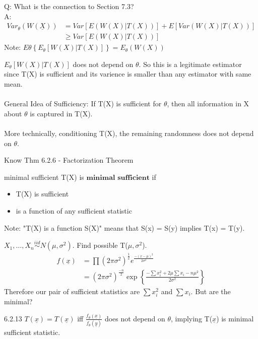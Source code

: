 \documentclass[11pt,fleqn]{book} %
\begin{document}
Q: What is the connection to Section 7.3?\\
A: \begin{align*}
Var_\theta(W(\underline{X})) &= Var\left[E(W(X)|T(X))\right] + E\left[Var(W(X)|T(X)) \right]\\
&\ge Var\left[E(W(X)|T(X))\right]	
\end{align*} 
Note: $E\theta \left\{E_\theta[W(X)|T(X)] \right\} = E_\theta(W(X))$

$E_\theta[W(X)|T(X)]$ does not depend on $\theta$. So this is a legitimate estimator since T(X) is sufficient and its varience is smaller than any estimator with same mean. \\
\\
General Idea of Sufficiency: If T(X) is sufficient for $\theta$, then all information in X about $\theta$ is captured in T(X). \\
\\
More technically, conditioning T(X), the remaining randomness does not depend on $\theta$.

\begin{remark}
	Know Thm 6.2.6 - Factorization Theorem
\end{remark}

\begin{definition}{minimal sufficient}
	 T(X) is $\textbf{minimal sufficient}$ if 
	 \begin{itemize}
	 	\item T(X) is sufficient
	 	\item is a function of any sufficient statistic
	 \end{itemize}
	 Note: "T(X) is a function S(X)" means that S(x) = S(y) implies T(x) = T(y).
\end{definition}

\begin{example}
	 $X_1, \dots, X_n \stackrel{iid}{\sim} N(\mu,\sigma^2)$. Find possible T($\mu,\sigma^2$).\\
	 \begin{align*}
	 f(\underline{x}) &= \prod (2\pi\sigma^2)^{\frac{1}{2}} e^{\frac{-(x-\mu)^2}{2\sigma^2}}\\
	 &= (2\pi\sigma^2)^{\frac{-n}{2}}\exp\left\{\frac{-\sum x_i^2 + 2\mu \sum x_i - n\mu^2}{2\sigma^2}\right\}
	 \end{align*}
Therefore our pair of sufficient statistics are $\sum x_i^2$ and $\sum x_i$. But are the minimal?
\end{example}

\begin{theorem}{6.2.13} $T(\underline{x}) = T(\underline{x})$ iff $\frac{f_\theta (\underline{x})}{f_\theta(\underline{y})}$ does not depend on $\theta$, implying T($\underline{x}$) is minimal sufficient statistic. 
\end{theorem}
\end{document}
